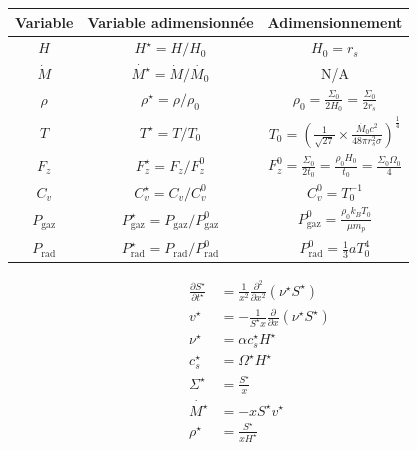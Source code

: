 \documentclass[french]{beamer}
\begin{document}
\begin{frame}
\begin{center}
    \begin{tabular}{|c|c|c|}
        \hline
        Variable & Variable adimensionnée & Adimensionnement \\
        \hline
         $H$ & $H^\star = H/H_0$ & $H_0 = r_s$ \\
        $\dot{M}$ & $\dot{M^\star} = \dot{M}/\dot{M_0}$ & N/A \\
        $\rho$ & $\rho^\star = \rho/\rho_0$ & $\rho_0 = \frac{\Sigma_0}{2 H_0} = \frac{\Sigma_0}{2 r_s}$ \\	
        $T$ & $T^\star = T/T_0$ & $T_0 = \left(\frac{1}{\sqrt{27}} \times \frac{\dot{M_0} c^2}{48 \pi r_s^2 \sigma} \right)^\frac{1}{4}$ \\
$F_z$ & $F_z^\star = F_z/F_z^0$ & $F_z^0 = \frac{\Sigma_0}{2 t_0} = \frac{\rho_0 H_0}{t_0} = \frac{\Sigma_0 \Omega_0}{4}$ \\
        $C_v$ & $C_v^\star = C_v/C_v^0$ & $C_v^0 = T_0^{-1}$ \\
        $P_\mathrm{gaz}$ & $P_\mathrm{gaz}^\star = P_\mathrm{gaz}/P_\mathrm{gaz}^0$ & $P_\mathrm{gaz}^0 = \frac{\rho_0 k_B T_0}{\mu m_p}$ \\
        $P_\mathrm{rad}$ & $P_\mathrm{rad}^\star = P_\mathrm{rad}/P_\mathrm{rad}^0$ & $P_\mathrm{rad}^0 = \frac{1}{3} a T_0^4$ \\
	     \hline
    \end{tabular}
\end{center}
\end{frame}

\begin{frame}
	\begin{subequations}
    \begin{align}
        \frac{\partial S^\star}{\partial t^\star} &= \frac{1}{x^2} \frac{\partial^2}{\partial x^2} \left(\nu^\star S^\star\right) \\
        v^\star &= - \frac{1}{S^\star x} \frac{\partial}{\partial x} \left(\nu^\star S^\star\right) \\
        \nu^\star &= \alpha c_s^\star H^\star \\
        c_s^\star &= \Omega^\star H^\star \\
        \Sigma^\star &= \frac{S^\star}{x} \\
        \dot{M^\star} &= - x S^\star v^\star \\
        \rho^\star &= \frac{S^\star}{x H^\star} \\
    \end{align}
\end{subequations}
\end{frame} 
\end{document}
